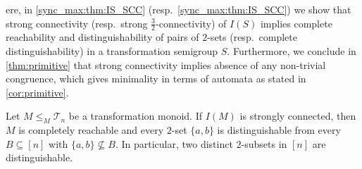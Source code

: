 

ere, in \cref{sync_max:thm:IS_SCC} (resp.~\cref{sync_max:thm:IS_SCC})
we show that strong connectivity (resp.~strong $\frac{3}{2}$-connectivity)
of $I(S)$ implies complete reachability and distinguishability
of pairs of $2$-sets (resp.~complete distinguishability) in a transformation semigroup $S$.
Furthermore, we conclude in \cref{thm:primitive} that strong connectivity
implies absence of any non-trivial congruence,
which gives minimality in terms of automata as stated in \cref{cor:primitive}.

\begin{theorem}
	\label{sync_max:thm:IS_SCC}
	Let $M \le_M \mathcal T_n$ be a transformation monoid. If $I(M)$ is strongly connected, then
	$M$ is completely reachable and 
	every $2$-set $\{a,b\}$ is distinguishable
	from every $B \subseteq [n]$
	with $\{a,b\} \not\subseteq B$.	
    In particular, two distinct $2$-subsets in $[n]$ are distinguishable.   
\end{theorem}
